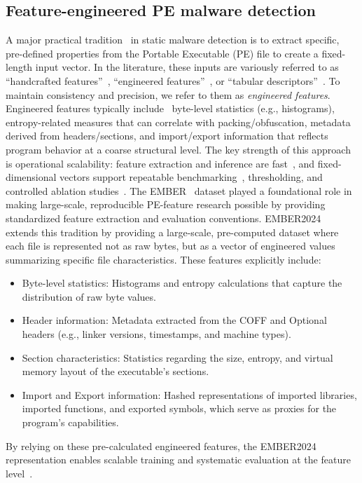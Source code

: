 \documentclass[conference]{IEEEtran}
\begin{document}
\subsection{Feature-engineered PE malware detection} %

A major practical tradition~\cite{HP20182018} in static malware detection is to extract specific, pre-defined properties from the Portable Executable (PE) file to create a fixed-length input vector.
In the literature, these inputs are variously referred to as ``handcrafted features''~\cite{MT2025,EDS2020}, ``engineered features''~\cite{HP20182018}, or ``tabular descriptors''~\cite{JMGPR2024}.
To maintain consistency and precision, we refer to them as \emph{engineered features}.
Engineered features typically include~\cite{KBSSSK2025} byte-level statistics (e.g., histograms), entropy-related measures that can correlate with packing/obfuscation, metadata derived from headers/sections, and import/export information that reflects program behavior at a coarse structural level.
The key strength of this approach is operational scalability: feature extraction and inference are fast~\cite{EDS2020}, and fixed-dimensional vectors support repeatable benchmarking~\cite{JMGPR2024}, thresholding, and controlled ablation studies~\cite{AQPWPWCR2022}.
The EMBER~\cite{HP20182018} dataset played a foundational role in making large-scale, reproducible PE-feature research possible by providing standardized feature extraction and evaluation conventions.
EMBER2024~\cite{JMGPR2024} extends this tradition by providing a large-scale, pre-computed dataset where each file is represented not as raw bytes, but as a vector of engineered values summarizing specific file characteristics.
These features explicitly include:
\begin{itemize}
\item 
Byte-level statistics:
Histograms and entropy calculations that capture the distribution of raw byte values.
\item 
Header information: 
Metadata extracted from the COFF and Optional headers (e.g., linker versions, timestamps, and machine types).
\item 
Section characteristics: 
Statistics regarding the size, entropy, and virtual memory layout of the executable's sections.
\item
Import and Export information: 
Hashed representations of imported libraries, imported functions, and exported symbols, which serve as proxies for the program's capabilities.
\end{itemize}
By relying on these pre-calculated engineered features, the EMBER2024 representation enables scalable training and systematic evaluation at the feature level~\cite{JMGPR2024,HP20182018}.
\end{document}
